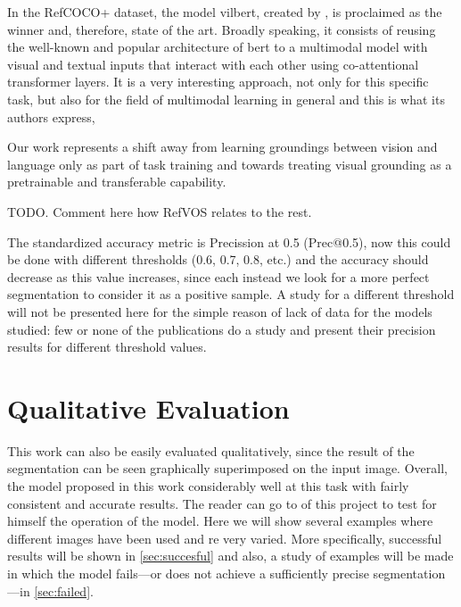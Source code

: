 In the RefCOCO+ dataset, the model \gls{vilbert}, created by
, is proclaimed as the winner and, therefore, state of the
art. Broadly speaking, it consists of reusing the well-known and popular
architecture of \gls{bert} to a multimodal model with visual and textual inputs
that interact with each other using co-attentional transformer layers. It is a
very interesting approach, not only for this specific task, but also for the
field of multimodal learning in general and this is what its authors express,

\begin{quoteBox}
  Our work represents a shift away from learning groundings between vision and
  language only as part of task training and towards treating visual grounding
  as a pretrainable and transferable capability. \tcblower
\end{quoteBox}

TODO. Comment here how RefVOS relates to the rest.

The standardized accuracy metric is Precission at 0.5 (Prec@0.5), now this
could be done with different thresholds (0.6, 0.7, 0.8, etc.) and the accuracy
should decrease as this value increases, since each instead we look for a more
perfect segmentation to consider it as a positive sample. A study for a
different threshold will not be presented here for the simple reason of lack of
data for the models studied: few or none of the publications do a study and
present their precision results for different threshold values.


\section{Qualitative Evaluation}\label{sec:qualitative-eval-res}

This work can also be easily evaluated qualitatively, since the result of the
segmentation can be seen graphically superimposed on the input image. Overall,
the model proposed in this work considerably well at this task with fairly
consistent and accurate results. The reader can go to
 of this project to test for
himself the operation of the model. Here we will show several examples where
different images have been used and \gls{re} very varied. More specifically,
successful results will be shown in \vref{sec:succesful} and also, a study of
examples will be made in which the model fails---or does not achieve a
sufficiently precise segmentation---in \vref{sec:failed}.


